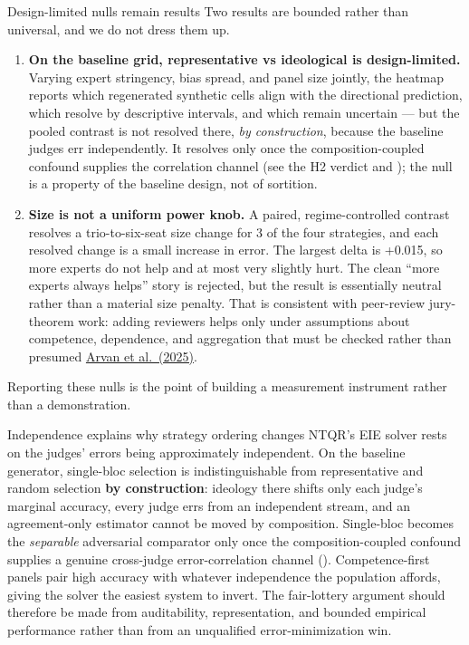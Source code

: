 \documentclass[
  ignorenonframetext,
]{beamer}
\begin{document}
\begin{frame}[allowframebreaks]{Design-limited nulls remain results}
\protect{}\label{design-limited-nulls-remain-results}
Two results are bounded rather than universal, and we do not dress them
up.

\begin{enumerate}
\item
  \textbf{On the baseline grid, representative vs ideological is
  design-limited.} Varying expert stringency, bias spread, and panel
  size jointly, the heatmap reports which regenerated synthetic cells
  align with the directional prediction, which resolve by descriptive
  intervals, and which remain uncertain --- but the pooled contrast is
  not resolved there, \emph{by construction}, because the baseline
  judges err independently. It resolves only once the
  composition-coupled confound supplies the correlation channel (see the
  H2 verdict and ); the null is a property of the
  baseline design, not of sortition.
\item
  \textbf{Size is not a uniform power knob.} A paired, regime-controlled
  contrast resolves a trio-to-six-seat size change for 3 of the four
  strategies, and each resolved change is a small increase in error. The
  largest delta is +0.015, so more experts do not help and at most very
  slightly hurt. The clean ``more experts always helps'' story is
  rejected, but the result is essentially neutral rather than a material
  size penalty. That is consistent with peer-review jury-theorem work:
  adding reviewers helps only under assumptions about competence,
  dependence, and aggregation that must be checked rather than presumed
  \href{https://doi.org/10.1086/719117}{Arvan et al.~(2025)}.
\end{enumerate}

Reporting these nulls is the point of building a measurement instrument
rather than a demonstration.
\end{frame}

\begin{frame}[allowframebreaks]{Independence explains why strategy
ordering changes}
\protect{}\label{independence-explains-why-strategy-ordering-changes}
NTQR's EIE solver rests on the judges' errors being approximately
independent. On the baseline generator, single-bloc selection is
indistinguishable from representative and random selection \textbf{by
construction}: ideology there shifts only each judge's marginal
accuracy, every judge errs from an independent stream, and an
agreement-only estimator cannot be moved by composition. Single-bloc
becomes the \emph{separable} adversarial comparator only once the
composition-coupled confound supplies a genuine cross-judge
error-correlation channel (). Competence-first
panels pair high accuracy with whatever independence the population
affords, giving the solver the easiest system to invert. The
fair-lottery argument should therefore be made from auditability,
representation, and bounded empirical performance rather than from an
unqualified error-minimization win.
\end{frame}
\end{document}
